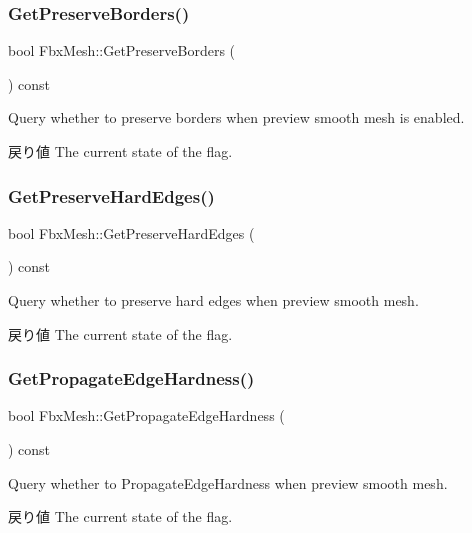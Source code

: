 \subsubsection{\texorpdfstring{Get\+Preserve\+Borders()}{GetPreserveBorders()}}
{\footnotesize\ttfamily bool Fbx\+Mesh\+::\+Get\+Preserve\+Borders (\begin{DoxyParamCaption}{ }\end{DoxyParamCaption}) const}

Query whether to preserve borders when preview smooth mesh is enabled. \begin{DoxyReturn}{戻り値}
The current state of the flag. 
\end{DoxyReturn}
\mbox{\label{class_fbx_mesh_a93c3cec3811368e69f968b9e84a96a31}} 
\subsubsection{\texorpdfstring{Get\+Preserve\+Hard\+Edges()}{GetPreserveHardEdges()}}
{\footnotesize\ttfamily bool Fbx\+Mesh\+::\+Get\+Preserve\+Hard\+Edges (\begin{DoxyParamCaption}{ }\end{DoxyParamCaption}) const}

Query whether to preserve hard edges when preview smooth mesh. \begin{DoxyReturn}{戻り値}
The current state of the flag. 
\end{DoxyReturn}
\mbox{\label{class_fbx_mesh_a146004786d53607346507bef4bd12101}} 
\subsubsection{\texorpdfstring{Get\+Propagate\+Edge\+Hardness()}{GetPropagateEdgeHardness()}}
{\footnotesize\ttfamily bool Fbx\+Mesh\+::\+Get\+Propagate\+Edge\+Hardness (\begin{DoxyParamCaption}{ }\end{DoxyParamCaption}) const}

Query whether to Propagate\+Edge\+Hardness when preview smooth mesh. \begin{DoxyReturn}{戻り値}
The current state of the flag. 
\end{DoxyReturn}
\mbox{\label{class_fbx_mesh_a33c7d29e88d7bb03e0343daca267d770}} 
